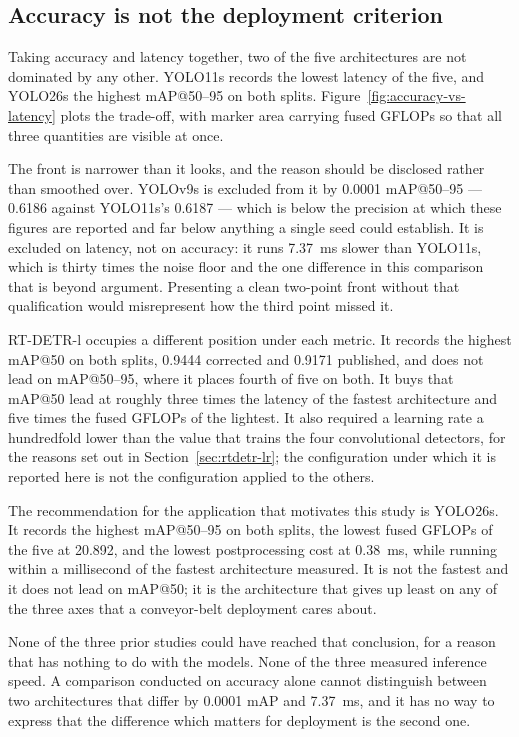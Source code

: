 

\subsection{Accuracy is not the deployment criterion}
\label{sec:deployment}

Taking accuracy and latency together, two of the five architectures are not
dominated by any other. YOLO11s records the lowest latency of the five, and
YOLO26s the highest mAP@50--95 on both splits.
Figure~\ref{fig:accuracy-vs-latency} plots
the trade-off, with marker area carrying fused GFLOPs so that all three
quantities are visible at once.

The front is narrower than it looks, and the reason should be disclosed rather
than smoothed over. YOLOv9s is excluded from it by 0.0001 mAP@50--95 --- 0.6186
against YOLO11s's 0.6187 --- which is below the precision at which these figures
are reported and far below anything a single seed could establish. It is
excluded on latency, not on accuracy: it runs 7.37~ms slower than YOLO11s, which
is thirty times the noise floor and the one difference in this comparison that is
beyond argument. Presenting a clean two-point front without that qualification
would misrepresent how the third point missed it.

RT-DETR-l occupies a different position under each metric. It records the
highest mAP@50 on both splits, 0.9444 corrected and 0.9171 published, and does
not lead on mAP@50--95, where it places fourth of five on both. It buys that
mAP@50 lead at roughly three times the latency of the fastest architecture and
five times the fused GFLOPs of the lightest. It also required a learning rate a
hundredfold lower than the value that trains the four convolutional detectors,
for the reasons set out in Section~\ref{sec:rtdetr-lr}; the configuration under
which it is reported here is not the configuration applied to the others.

The recommendation for the application that motivates this study is YOLO26s. It
records the highest mAP@50--95 on both splits, the lowest fused GFLOPs of the
five at 20.892, and the lowest postprocessing cost at 0.38~ms, while running
within a millisecond of the fastest architecture measured. It is not the fastest
and it does not lead on mAP@50; it is the architecture that gives up least on
any of the three axes that a conveyor-belt deployment cares about.

None of the three prior studies could have reached that conclusion, for a reason
that has nothing to do with the models. None of the three measured inference
speed.
A comparison conducted on accuracy alone cannot distinguish between two
architectures that differ by 0.0001 mAP and 7.37~ms, and it has no way to
express that the difference which matters for deployment is the second one.


